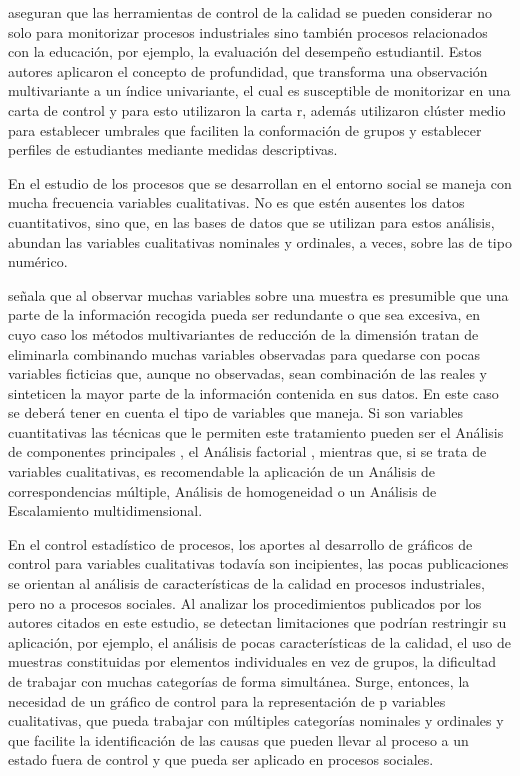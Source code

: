 \documentclass[mathematics,article,submit,moreauthors,pdftex]{mdpi}
\begin{document}
\citet{Saltos2020} aseguran que las herramientas de control de la
calidad se pueden considerar no solo para monitorizar procesos
industriales sino también procesos relacionados con la educación, por
ejemplo, la evaluación del desempeño estudiantil. Estos autores
aplicaron el concepto de profundidad, que transforma una observación
multivariante a un índice univariante, el cual es susceptible de
monitorizar en una carta de control y para esto utilizaron la carta r,
además utilizaron clúster medio para establecer umbrales que faciliten
la conformación de grupos y establecer perfiles de estudiantes mediante
medidas descriptivas.

En el estudio de los procesos que se desarrollan en el entorno social se
maneja con mucha frecuencia variables cualitativas. No es que estén
ausentes los datos cuantitativos, sino que, en las bases de datos que se
utilizan para estos análisis, abundan las variables cualitativas
nominales y ordinales, a veces, sobre las de tipo numérico.

\citet{perez2004} señala que al observar muchas variables sobre una
muestra es presumible que una parte de la información recogida pueda ser
redundante o que sea excesiva, en cuyo caso los métodos multivariantes
de reducción de la dimensión tratan de eliminarla combinando muchas
variables observadas para quedarse con pocas variables ficticias que,
aunque no observadas, sean combinación de las reales y sinteticen la
mayor parte de la información contenida en sus datos. En este caso se
deberá tener en cuenta el tipo de variables que maneja. Si son variables
cuantitativas las técnicas que le permiten este tratamiento pueden ser
el Análisis de componentes principales
\citep{Person1901, Hotelling1933}, el Análisis factorial
\citep{ch1904, thurstone1947, kaiser1958}, mientras que, si se trata de
variables cualitativas, es recomendable la aplicación de un Análisis de
correspondencias múltiple, Análisis de homogeneidad o un Análisis de
Escalamiento multidimensional.

En el control estadístico de procesos, los aportes al desarrollo de
gráficos de control para variables cualitativas todavía son incipientes,
las pocas publicaciones se orientan al análisis de características de la
calidad en procesos industriales, pero no a procesos sociales. Al
analizar los procedimientos publicados por los autores citados en este
estudio, se detectan limitaciones que podrían restringir su aplicación,
por ejemplo, el análisis de pocas características de la calidad, el uso
de muestras constituidas por elementos individuales en vez de grupos, la
dificultad de trabajar con muchas categorías de forma simultánea. Surge,
entonces, la necesidad de un gráfico de control para la representación
de p variables cualitativas, que pueda trabajar con múltiples categorías
nominales y ordinales y que facilite la identificación de las causas que
pueden llevar al proceso a un estado fuera de control y que pueda ser
aplicado en procesos sociales.
\end{document}
